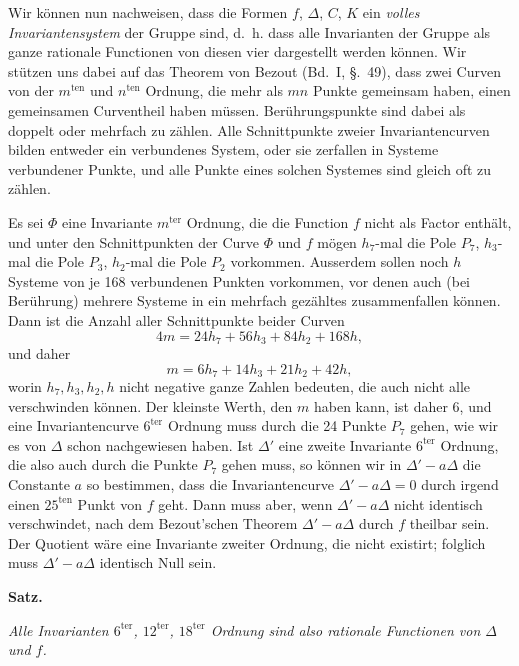 \documentclass[12pt,a4paper]{article}
\begin{document}
Wir k\"onnen nun nachweisen, dass die Formen $f$, $\Delta$, $C$, $K$ ein \textit{volles Invariantensystem} der Gruppe sind, d.~h. dass alle Invarianten der Gruppe als ganze rationale Functionen von diesen vier dargestellt werden k\"onnen. Wir st\"utzen uns dabei auf das Theorem von Bezout (Bd.~I, \S.~49), dass zwei Curven von der $m^{\text{ten}}$ und $n^{\text{ten}}$ Ordnung, die mehr als $mn$ Punkte gemeinsam haben, einen gemeinsamen Curventheil haben m\"ussen. Ber\"uhrungspunkte sind dabei als doppelt oder mehrfach zu z\"ahlen. Alle Schnittpunkte zweier Invariantencurven bilden entweder ein verbundenes System, oder sie zerfallen in Systeme verbundener Punkte, und alle Punkte eines solchen Systemes sind gleich oft zu z\"ahlen.

Es sei $\Phi$ eine Invariante $m^{\text{ter}}$ Ordnung, die die Function $f$ nicht als Factor enth\"alt, und unter den Schnittpunkten der Curve $\Phi$ und $f$ m\"ogen $h_7$-mal die Pole $P_7$, $h_3$-mal die Pole $P_3$, $h_2$-mal die Pole $P_2$ vorkommen. Ausserdem sollen noch $h$ Systeme von je 168 verbundenen Punkten vorkommen, vor denen auch (bei Ber\"uhrung) mehrere Systeme in ein mehrfach gez\"ahltes zusammenfallen k\"onnen. Dann ist die Anzahl aller Schnittpunkte beider Curven
\[4m = 24h_7 + 56h_3 + 84h_2 + 168h,\]
und daher
\begin{equation}
\label{eq:bezout} m = 6h_7 + 14h_3 + 21h_2 + 42h,
\end{equation}
worin $h_7, h_3, h_2, h$ nicht negative ganze Zahlen bedeuten, die auch nicht alle verschwinden k\"onnen. Der kleinste Werth, den $m$ haben kann, ist daher 6, und eine Invariantencurve $6^{\text{ter}}$ Ordnung muss durch die 24 Punkte $P_7$ gehen, wie wir es von $\Delta$ schon nachgewiesen haben. Ist $\Delta'$ eine zweite Invariante $6^{\text{ter}}$ Ordnung, die also auch durch die Punkte $P_7$ gehen muss, so k\"onnen wir in $\Delta' - a\Delta$ die Constante $a$ so bestimmen, dass die Invariantencurve $\Delta' - a\Delta = 0$ durch irgend einen $25^{\text{ten}}$ Punkt von $f$ geht. Dann muss aber, wenn $\Delta' - a\Delta$ nicht identisch verschwindet, nach dem Bezout'schen Theorem $\Delta' - a\Delta$ durch $f$ theilbar sein. Der Quotient w\"are eine Invariante zweiter Ordnung, die nicht existirt; folglich muss $\Delta' - a\Delta$ identisch Null sein.

\begin{center}\textbf{Satz.}\end{center}
\textit{Alle Invarianten $6^{\text{ter}}$, $12^{\text{ter}}$, $18^{\text{ter}}$ Ordnung sind also rationale Functionen von $\Delta$ und $f$.}
\end{document}
